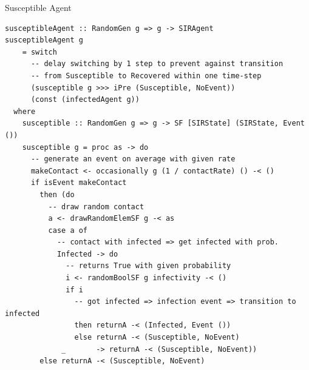 \documentclass{beamer}
\begin{document}
\begin{frame}[fragile]{Susceptible Agent}
\begin{verbatim}
susceptibleAgent :: RandomGen g => g -> SIRAgent
susceptibleAgent g 
    = switch 
      -- delay switching by 1 step to prevent against transition
      -- from Susceptible to Recovered within one time-step
      (susceptible g >>> iPre (Susceptible, NoEvent)) 
      (const (infectedAgent g))
  where
    susceptible :: RandomGen g => g -> SF [SIRState] (SIRState, Event ())
    susceptible g = proc as -> do
      -- generate an event on average with given rate
      makeContact <- occasionally g (1 / contactRate) () -< ()
      if isEvent makeContact
        then (do
          -- draw random contact
          a <- drawRandomElemSF g -< as
          case a of
            -- contact with infected => get infected with prob.
            Infected -> do
              -- returns True with given probability
              i <- randomBoolSF g infectivity -< ()
              if i
                -- got infected => infection event => transition to infected
                then returnA -< (Infected, Event ())
                else returnA -< (Susceptible, NoEvent)
             _       -> returnA -< (Susceptible, NoEvent))
        else returnA -< (Susceptible, NoEvent)
\end{verbatim}
\end{frame}
\end{document}
